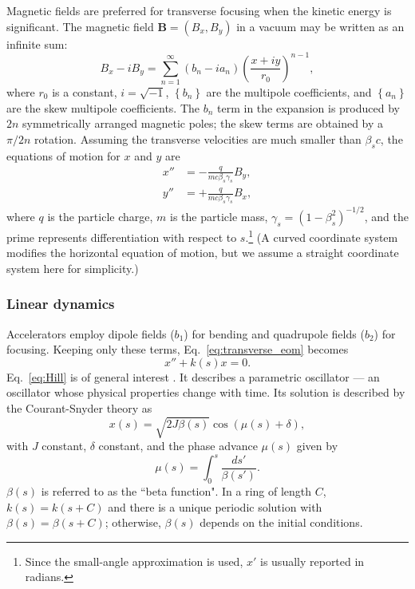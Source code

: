 Magnetic fields are preferred for transverse focusing when the kinetic energy is significant. The magnetic field $\mathbf{B} = (B_x, B_y)$ in a vacuum may be written as an infinite sum:
%
\begin{equation}\label{eq:magnetic_field_expansion}
    B_x - iB_y = \sum_{n = 1}^{\infty}{(b_n - i a_n) \left({\frac{x + i y}{r_0}}\right)^{n - 1}},
\end{equation}
%
where $r_0$ is a constant, $i = \sqrt{-1}$, $\left\{ b_n \right\}$ are the multipole coefficients, and $\left\{ a_n \right\}$ are the skew multipole coefficients. The $b_n$ term in the expansion is produced by $2n$ symmetrically arranged magnetic poles; the skew terms are obtained by a $\pi / 2n$ rotation. Assuming the transverse velocities are much smaller than $\beta_s c$, the equations of motion for $x$ and $y$ are
%
\begin{equation}\label{eq:transverse_eom}
\begin{aligned}
    x'' &= -\frac{q}{m c \beta_s \gamma_s} B_y, \\
    y'' &= +\frac{q}{m c \beta_s \gamma_s} B_x,
\end{aligned}
\end{equation}
%
where $q$ is the particle charge, $m$ is the particle mass, $\gamma_s = (1 - \beta_s^2)^{-1/2}$, and the prime represents differentiation with respect to $s$.\footnote{Since the small-angle approximation is used, $x'$ is usually reported in radians.} (A curved coordinate system modifies the horizontal equation of motion, but we assume a straight coordinate system here for simplicity.)


\subsubsection{Linear dynamics}

 Accelerators employ dipole fields ($b_1$) for bending and quadrupole fields ($b_2$) for focusing. Keeping only these terms, Eq.~\eqref{eq:transverse_eom} becomes
%
 \begin{equation}\label{eq:Hill}
     x'' + k(s)x = 0.
 \end{equation}
%
Eq.~\eqref{eq:Hill} is of general interest \cite{Qin2007}. It describes a parametric oscillator — an oscillator whose physical properties change with time. Its solution is described by the Courant-Snyder theory \cite{Courant1958} as
%
\begin{equation}\label{eq:Hill_solution}
    x(s) = \sqrt{2 J \beta(s)} \cos{\left({\mu(s) + \delta}\right)},
\end{equation}
%
with $J$ constant, $\delta$ constant, and the phase advance $\mu(s)$ given by
%
\begin{equation}
    \mu(s) = \int_{0}^{s}{\frac{ds'}{\beta(s')}}.
\end{equation}
%
$\beta(s)$ is referred to as the ``beta function". In a ring of length $C$, $k(s) = k(s + C)$ and there is a unique periodic solution with $\beta(s) = \beta(s + C)$; otherwise, $\beta(s)$ depends on the initial conditions.

